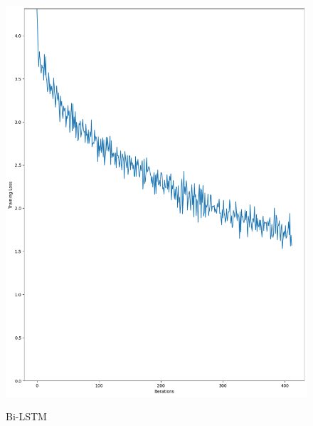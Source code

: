 \documentclass{article}
\begin{document}
\begin{figure}[htbp]
\begin{minipage}[t]{0.19\textwidth}
        \includegraphics[width=\textwidth]{img/LSTMBi_learning.png} \\
        \caption{Bi-LSTM}
        \label{fig:bilstm}
    \end{minipage}
    \hfill
    \begin{minipage}[t]{0.19\textwidth}
        \centering

\end{minipage}
\end{figure}
\end{document}
